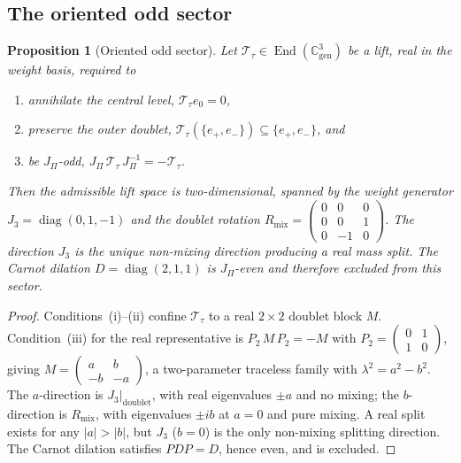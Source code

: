 \documentclass[11pt,a4paper]{article}
\newtheorem{proposition}[theorem]{Proposition}
\theoremstyle{definition}
\theoremstyle{remark}
\DeclareMathOperator{\End}{End}
\begin{document}
  \subsection{The oriented odd sector}
    \label{ssec:dg-odd}

    \begin{proposition}[Oriented odd sector]
      \label{prop:dg-odd}
      Let $\mathcal{T}_\tau \in \End(\mathbb{C}^3_{\mathrm{gen}})$ be a lift, real in the weight basis,
      required to
      \begin{enumerate}
        \item[\emph{(i)}]   annihilate the central level, $\mathcal{T}_\tau e_0 = 0$,
        \item[\emph{(ii)}]  preserve the outer doublet,
        $\mathcal{T}_\tau(\{e_+, e_-\}) \subseteq \{e_+, e_-\}$, and
        \item[\emph{(iii)}] be $J_\Pi$-odd, $J_\Pi\, \mathcal{T}_\tau\, J_\Pi^{-1} = -\mathcal{T}_\tau$.
      \end{enumerate}
      Then the admissible lift space is two-dimensional, spanned by the weight generator
      $J_3 = \operatorname{diag}(0, 1, -1)$ and the doublet rotation
      $R_{\mathrm{mix}} = \left(\begin{smallmatrix} 0 & 0 & 0 \\ 0 & 0 & 1 \\ 0 & -1 & 0
      \end{smallmatrix}\right)$.
      The direction $J_3$ is the unique non-mixing direction producing a real mass split.
      The Carnot dilation $D = \operatorname{diag}(2, 1, 1)$ is $J_\Pi$-even and therefore excluded
      from this sector.
    \end{proposition}

    \begin{proof}
      Conditions~(i)--(ii) confine $\mathcal{T}_\tau$ to a real $2 \times 2$ doublet block $M$.
      Condition~(iii) for the real representative is $P_2\, M\, P_2 = -M$ with
      $P_2 = \left(\begin{smallmatrix} 0 & 1 \\ 1 & 0 \end{smallmatrix}\right)$, giving
      $M = \left(\begin{smallmatrix} a & b \\ -b & -a \end{smallmatrix}\right)$, a two-parameter
      traceless family with $\lambda^2 = a^2 - b^2$.
      The $a$-direction is $J_3|_{\mathrm{doublet}}$, with real eigenvalues $\pm a$ and no mixing;
      the $b$-direction is $R_{\mathrm{mix}}$, with eigenvalues $\pm i b$ at $a = 0$ and pure
      mixing.
      A real split exists for any $|a| > |b|$, but $J_3$ ($b = 0$) is the only non-mixing splitting
      direction.
      The Carnot dilation satisfies $P D P = D$, hence even, and is excluded.
    \end{proof}
\end{document}
